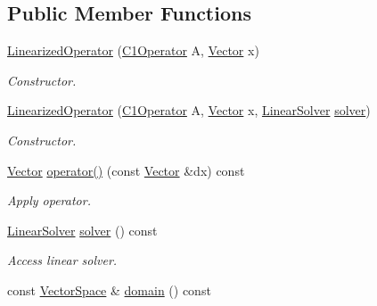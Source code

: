 \subsection*{Public Member Functions}
\begin{DoxyCompactItemize}
\item 
\hyperlink{classSpacy_1_1LinearizedOperator_a4abd53567430614653c56cc29a6fcde0_a4abd53567430614653c56cc29a6fcde0}{Linearized\+Operator} (\hyperlink{group__SpacyGroup_ga87ae8cb0d7a567a4bb181e0a9f182620_ga87ae8cb0d7a567a4bb181e0a9f182620}{C1\+Operator} A, \hyperlink{classSpacy_1_1Vector}{Vector} x)
\begin{DoxyCompactList}\small\item\em Constructor. \end{DoxyCompactList}\item 
\hyperlink{classSpacy_1_1LinearizedOperator_ab0141d921ce22831128dd1f2a5a89eda_ab0141d921ce22831128dd1f2a5a89eda}{Linearized\+Operator} (\hyperlink{group__SpacyGroup_ga87ae8cb0d7a567a4bb181e0a9f182620_ga87ae8cb0d7a567a4bb181e0a9f182620}{C1\+Operator} A, \hyperlink{classSpacy_1_1Vector}{Vector} x, \hyperlink{namespaceSpacy_a7d5cd1c6fb9dd85aa345b536caf30bba_a7d5cd1c6fb9dd85aa345b536caf30bba}{Linear\+Solver} \hyperlink{classSpacy_1_1LinearizedOperator_a8e26eebdf3236200c738ab76eed5d3d6_a8e26eebdf3236200c738ab76eed5d3d6}{solver})
\begin{DoxyCompactList}\small\item\em Constructor. \end{DoxyCompactList}\item 
\hyperlink{classSpacy_1_1Vector}{Vector} \hyperlink{classSpacy_1_1LinearizedOperator_a9cbed75d8eee66210769d385d4a31ef0_a9cbed75d8eee66210769d385d4a31ef0}{operator()} (const \hyperlink{classSpacy_1_1Vector}{Vector} \&dx) const 
\begin{DoxyCompactList}\small\item\em Apply operator. \end{DoxyCompactList}\item 
\hyperlink{namespaceSpacy_a7d5cd1c6fb9dd85aa345b536caf30bba_a7d5cd1c6fb9dd85aa345b536caf30bba}{Linear\+Solver} \hyperlink{classSpacy_1_1LinearizedOperator_a8e26eebdf3236200c738ab76eed5d3d6_a8e26eebdf3236200c738ab76eed5d3d6}{solver} () const 
\begin{DoxyCompactList}\small\item\em Access linear solver. \end{DoxyCompactList}\item 
const \hyperlink{classSpacy_1_1VectorSpace}{Vector\+Space} \& \hyperlink{classSpacy_1_1OperatorBase_a2588f9b3e0188820c4c494e63293dc6f_a2588f9b3e0188820c4c494e63293dc6f}{domain} () const 

\end{DoxyCompactItemize}

